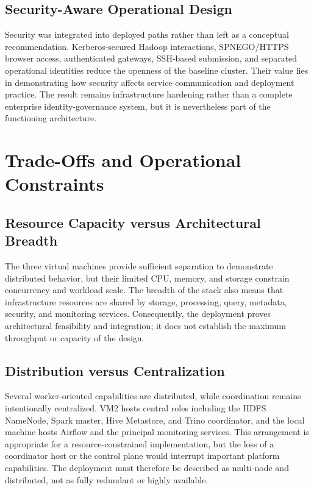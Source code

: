 \subsection{Security-Aware Operational Design}
Security was integrated into deployed paths rather than left as a conceptual recommendation. Kerberos-secured Hadoop interactions, SPNEGO/HTTPS browser access, authenticated gateways, SSH-based submission, and separated operational identities reduce the openness of the baseline cluster. Their value lies in demonstrating how security affects service communication and deployment practice. The result remains infrastructure hardening rather than a complete enterprise identity-governance system, but it is nevertheless part of the functioning architecture.

\section{Trade-Offs and Operational Constraints}
\subsection{Resource Capacity versus Architectural Breadth}
The three virtual machines provide sufficient separation to demonstrate distributed behavior, but their limited CPU, memory, and storage constrain concurrency and workload scale. The breadth of the stack also means that infrastructure resources are shared by storage, processing, query, metadata, security, and monitoring services. Consequently, the deployment proves architectural feasibility and integration; it does not establish the maximum throughput or capacity of the design.

\subsection{Distribution versus Centralization}
Several worker-oriented capabilities are distributed, while coordination remains intentionally centralized. VM2 hosts central roles including the HDFS NameNode, Spark master, Hive Metastore, and Trino coordinator, and the local machine hosts Airflow and the principal monitoring services. This arrangement is appropriate for a resource-constrained implementation, but the loss of a coordinator host or the control plane would interrupt important platform capabilities. The deployment must therefore be described as multi-node and distributed, not as fully redundant or highly available.

